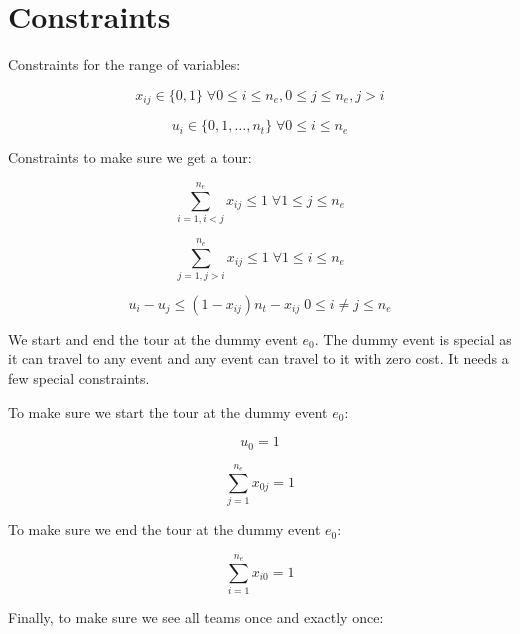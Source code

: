 \documentclass[11pt]{article}
\begin{document}
\section{Constraints}
Constraints for the range of variables:

\begin{equation} \label{constr:x}
    x_{ij} \in \{0, 1\} \; \forall 0 \leq i \leq n_e, 0 \leq j \leq n_e, j > i
\end{equation}

\begin{equation} \label{constr:u}
    u_i \in \{0, 1, \ldots, n_t\} \; \forall 0 \leq i \leq n_e
\end{equation}

Constraints to make sure we get a tour:

\begin{equation} \label{constr:in_edge}
    \sum_{i=1, i < j}^{n_e} x_{ij} \leq 1 \; \forall 1 \leq j \leq n_e
\end{equation}

\begin{equation} \label{constr:out_edge}
    \sum_{j=1, j > i}^{n_e} x_{ij} \leq 1 \; \forall 1 \leq i \leq n_e
\end{equation}

\begin{equation} \label{constr:order}
    u_i - u_j \leq (1 - x_{ij})n_t - x_{ij} \; 0 \leq i \neq j \leq n_e
\end{equation}

We start and end the tour at the dummy event $e_0$. The dummy event is special as it can travel to any event and any event can travel to it with zero cost. It needs a few special constraints.

To make sure we start the tour at the dummy event $e_0$:

\begin{equation} \label{constr:start}
    u_0 = 1
\end{equation}

\begin{equation} \label{constr:start_out_edge}
    \sum_{j=1}^{n_e} x_{0j} = 1
\end{equation}

To make sure we end the tour at the dummy event $e_0$:

\begin{equation} \label{constr:end}
    \sum_{i=1}^{n_e} x_{i0} = 1
\end{equation}

Finally, to make sure we see all teams once and exactly once:
\end{document}
